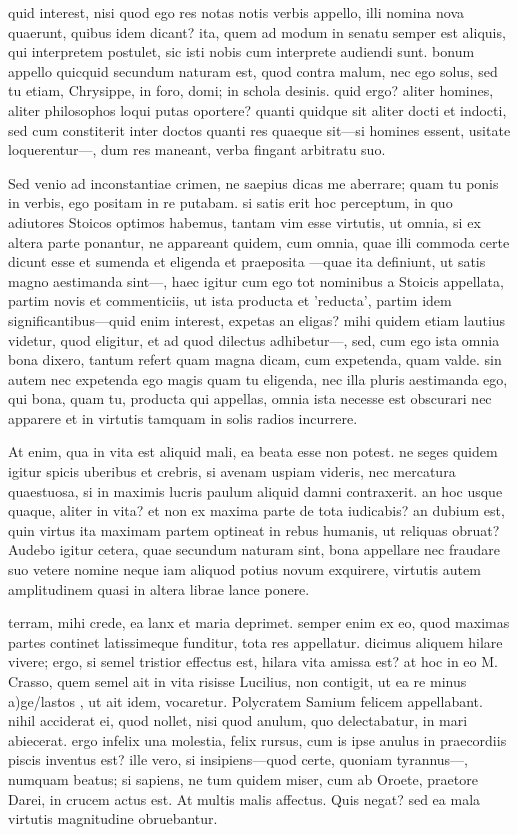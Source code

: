  quid interest, nisi quod ego res notas notis verbis appello, illi nomina nova quaerunt, quibus idem dicant? ita, quem ad modum in senatu semper est aliquis, qui interpretem postulet, sic isti nobis cum interprete audiendi sunt. bonum appello quicquid secundum naturam est, quod contra malum, nec ego solus, sed tu etiam, Chrysippe, in foro, domi; in schola desinis. quid ergo? aliter homines, aliter philosophos loqui putas oportere? quanti quidque sit aliter docti et indocti, sed cum constiterit inter doctos quanti res quaeque sit—si homines essent, usitate loquerentur—, dum res maneant, verba fingant arbitratu suo.

 Sed venio ad inconstantiae crimen, ne saepius dicas me aberrare; quam tu ponis in verbis, ego positam in re putabam. si satis erit hoc perceptum, in quo adiutores Stoicos optimos habemus, tantam vim esse virtutis, ut omnia, si ex altera parte ponantur, ne appareant quidem, cum omnia, quae illi commoda certe dicunt esse et sumenda et eligenda et praeposita —quae ita definiunt, ut satis magno aestimanda sint—, haec igitur cum ego tot nominibus a Stoicis appellata, partim novis et commenticiis, ut ista producta et 'reducta', partim idem significantibus—quid enim interest, expetas an eligas? mihi quidem etiam lautius videtur, quod eligitur, et ad quod dilectus adhibetur—, sed, cum ego ista omnia bona dixero, tantum refert quam magna dicam, cum expetenda, quam valde. sin autem nec expetenda ego magis quam tu eligenda, nec illa pluris aestimanda ego, qui bona, quam tu, producta qui appellas, omnia ista necesse est obscurari nec apparere et in virtutis tamquam in solis radios incurrere.

 At enim, qua in vita est aliquid mali, ea beata esse non potest. ne seges quidem igitur spicis uberibus et crebris, si avenam uspiam videris, nec mercatura quaestuosa, si in maximis lucris paulum aliquid damni contraxerit. an hoc usque quaque, aliter in vita? et non ex maxima parte de tota iudicabis? an dubium est, quin virtus ita maximam partem optineat in rebus humanis, ut reliquas obruat? Audebo igitur cetera, quae secundum naturam sint, bona appellare nec fraudare suo vetere nomine neque iam aliquod potius novum exquirere, virtutis autem amplitudinem quasi in altera librae lance ponere.

 terram, mihi crede, ea lanx et maria deprimet. semper enim ex eo, quod maximas partes continet latissimeque funditur, tota res appellatur. dicimus aliquem hilare vivere; ergo, si semel tristior effectus est, hilara vita amissa est? at hoc in eo M. Crasso, quem semel ait in vita risisse Lucilius, non contigit, ut ea re minus a)ge/lastos , ut ait idem, vocaretur. Polycratem Samium felicem appellabant. nihil acciderat ei, quod nollet, nisi quod anulum, quo delectabatur, in mari abiecerat. ergo infelix una molestia, felix rursus, cum is ipse anulus in praecordiis piscis inventus est? ille vero, si insipiens—quod certe, quoniam tyrannus—, numquam beatus; si sapiens, ne tum quidem miser, cum ab Oroete, praetore Darei, in crucem actus est. At multis malis affectus. Quis negat? sed ea mala virtutis magnitudine obruebantur.


